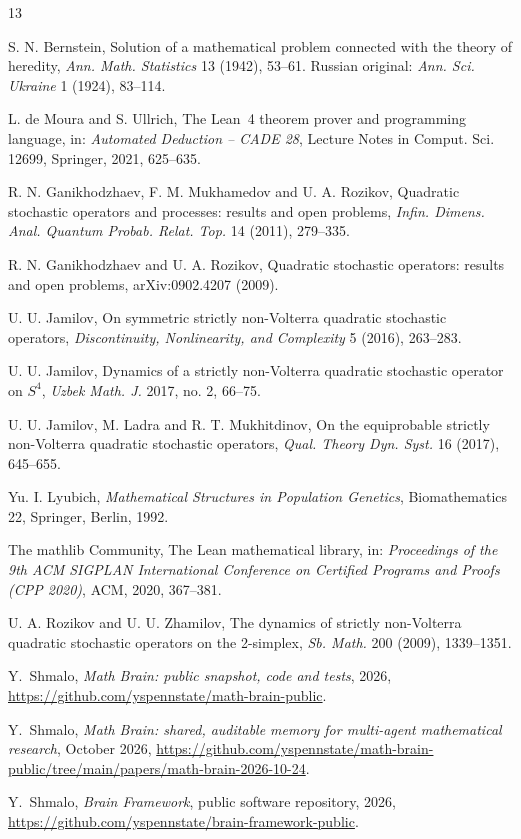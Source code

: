 \documentclass[11pt]{amsart}
\theoremstyle{definition}
\begin{document}
\begin{thebibliography}{13}

 S. N. Bernstein, Solution of a mathematical problem connected with the theory of heredity, \emph{Ann. Math. Statistics} 13 (1942), 53--61. Russian original: \emph{Ann. Sci. Ukraine} 1 (1924), 83--114.

 L. de Moura and S. Ullrich, The Lean~4 theorem prover and programming language, in: \emph{Automated Deduction -- CADE 28}, Lecture Notes in Comput. Sci. 12699, Springer, 2021, 625--635.

 R. N. Ganikhodzhaev, F. M. Mukhamedov and U. A. Rozikov, Quadratic stochastic operators and processes: results and open problems, \emph{Infin. Dimens. Anal. Quantum Probab. Relat. Top.} 14 (2011), 279--335.

 R. N. Ganikhodzhaev and U. A. Rozikov, Quadratic stochastic operators: results and open problems, arXiv:0902.4207 (2009).

 U. U. Jamilov, On symmetric strictly non-Volterra quadratic stochastic operators, \emph{Discontinuity, Nonlinearity, and Complexity} 5 (2016), 263--283.

 U. U. Jamilov, Dynamics of a strictly non-Volterra quadratic stochastic operator on $S^4$, \emph{Uzbek Math. J.} 2017, no. 2, 66--75.

 U. U. Jamilov, M. Ladra and R. T. Mukhitdinov, On the equiprobable strictly non-Volterra quadratic stochastic operators, \emph{Qual. Theory Dyn. Syst.} 16 (2017), 645--655.

 Yu. I. Lyubich, \emph{Mathematical Structures in Population Genetics}, Biomathematics 22, Springer, Berlin, 1992.

 The mathlib Community, The Lean mathematical library, in: \emph{Proceedings of the 9th ACM SIGPLAN International Conference on Certified Programs and Proofs (CPP 2020)}, ACM, 2020, 367--381.

 U. A. Rozikov and U. U. Zhamilov, The dynamics of strictly non-Volterra quadratic stochastic operators on the 2-simplex, \emph{Sb. Math.} 200 (2009), 1339--1351.

 Y.~Shmalo, \emph{Math Brain: public snapshot, code and tests}, 2026, \url{https://github.com/yspennstate/math-brain-public}.

 Y.~Shmalo, \emph{Math Brain: shared, auditable memory for multi-agent mathematical research}, October 2026, \url{https://github.com/yspennstate/math-brain-public/tree/main/papers/math-brain-2026-10-24}.

 Y.~Shmalo, \emph{Brain Framework}, public software repository, 2026, \url{https://github.com/yspennstate/brain-framework-public}.

\end{thebibliography}
\end{document}
